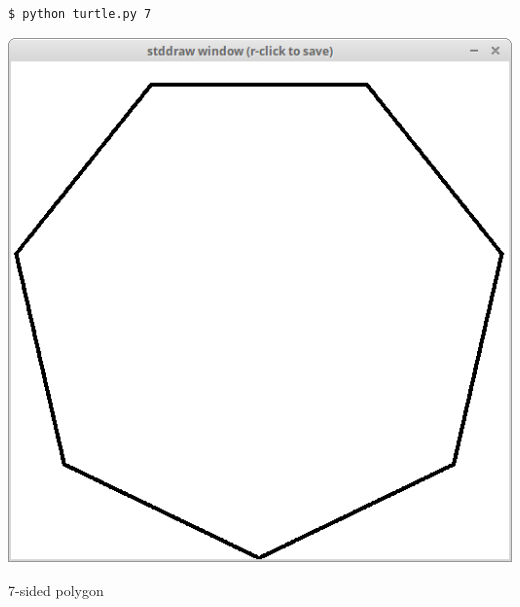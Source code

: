 \documentclass[8pt,a4paper,compress,handout]{beamer}
\begin{document}
\begin{frame}[fragile]
\begin{minipage}{200pt}
\begin{lstlisting}[language={}]
$ python turtle.py 7
\end{lstlisting}
\end{minipage}%
\hfill
\begin{minipage}{100pt}
\begin{center}
\includegraphics[scale=0.12]{figures/turtle2.png}

\smallskip

\tiny 7-sided polygon
\end{center}
\end{minipage}%

\bigskip


\end{frame}
\end{document}
